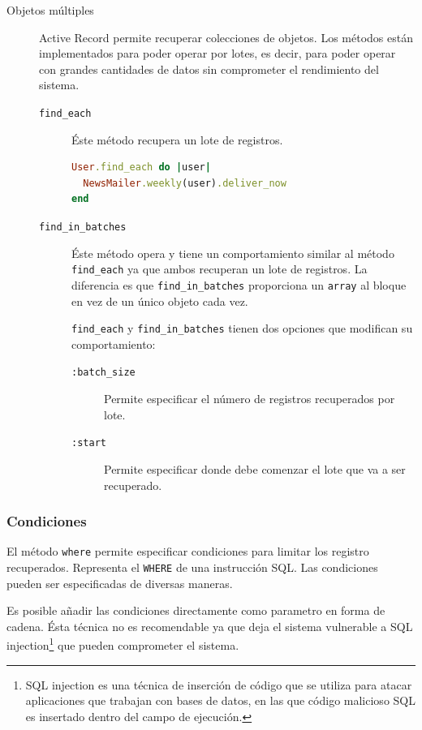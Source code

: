 \begin{description}
	\item[Objetos múltiples] Active Record permite recuperar colecciones de objetos. Los métodos están implementados para poder operar por lotes, es decir, para poder operar con grandes cantidades de datos sin comprometer el rendimiento del sistema.
	\begin{description}
		\item[\texttt{find\_each}] Éste método recupera un lote de registros.
\begin{lstlisting}[language=Ruby]
User.find_each do |user|
  NewsMailer.weekly(user).deliver_now
end
\end{lstlisting}
		
		\item[\texttt{find\_in\_batches}] Éste método opera y tiene un comportamiento similar al método \texttt{find\_each} ya que ambos recuperan un lote de registros. La diferencia es que \texttt{find\_in\_batches} proporciona un \texttt{array} al bloque en vez de un único objeto cada vez.
		
\texttt{find\_each} y \texttt{find\_in\_batches} tienen dos opciones que modifican su comportamiento:
		\begin{description}
			\item[\texttt{:batch\_size}] Permite especificar el número de registros recuperados por lote.
			\item[\texttt{:start}] Permite especificar donde debe comenzar el lote que va a ser recuperado.
		\end{description}		
	\end{description}
\end{description}


\subsubsection{Condiciones}
El método \texttt{where} permite especificar condiciones para limitar los registro recuperados. Representa el \texttt{WHERE} de una instrucción SQL. Las condiciones pueden ser especificadas de diversas maneras.

Es posible añadir las condiciones directamente como parametro en forma de cadena. Ésta técnica no es recomendable ya que deja el sistema vulnerable a SQL injection\footnote{SQL injection es una técnica de inserción de código que se utiliza para atacar aplicaciones que trabajan con bases de datos, en las que código malicioso SQL es insertado dentro del campo de ejecución.} que pueden comprometer el sistema.


